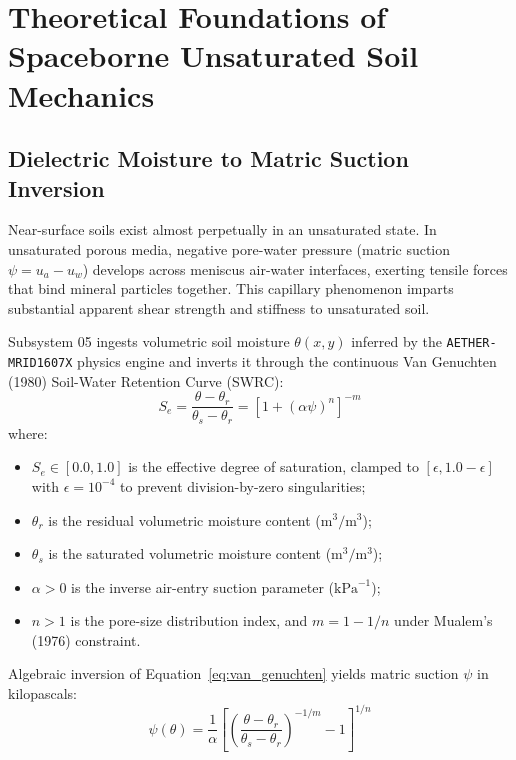 \documentclass[11pt,a4paper]{article}
\theoremstyle{definition}
\theoremstyle{remark}
\begin{document}
\section{Theoretical Foundations of Spaceborne Unsaturated Soil Mechanics}

\subsection{Dielectric Moisture to Matric Suction Inversion}
Near-surface soils exist almost perpetually in an unsaturated state. In unsaturated porous media, negative pore-water pressure (matric suction $\psi = u_a - u_w$) develops across meniscus air-water interfaces, exerting tensile forces that bind mineral particles together. This capillary phenomenon imparts substantial apparent shear strength and stiffness to unsaturated soil.

Subsystem 05 ingests volumetric soil moisture $\theta(x, y)$ inferred by the \texttt{AETHER-MRID1607X} physics engine and inverts it through the continuous Van Genuchten (1980) Soil-Water Retention Curve (SWRC):
\begin{equation}
    S_e = \frac{\theta - \theta_r}{\theta_s - \theta_r} = \left[ 1 + (\alpha \psi)^n \right]^{-m}
    \label{eq:van_genuchten}
\end{equation}
\noindent where:
\begin{itemize}
    \item $S_e \in [0.0, 1.0]$ is the effective degree of saturation, clamped to $[\epsilon, 1.0 - \epsilon]$ with $\epsilon = 10^{-4}$ to prevent division-by-zero singularities;
    \item $\theta_r$ is the residual volumetric moisture content ($\text{m}^3/\text{m}^3$);
    \item $\theta_s$ is the saturated volumetric moisture content ($\text{m}^3/\text{m}^3$);
    \item $\alpha > 0$ is the inverse air-entry suction parameter ($\text{kPa}^{-1}$);
    \item $n > 1$ is the pore-size distribution index, and $m = 1 - 1/n$ under Mualem's (1976) constraint.
\end{itemize}

Algebraic inversion of Equation~\eqref{eq:van_genuchten} yields matric suction $\psi$ in kilopascals:
\begin{equation}
    \psi(\theta) = \frac{1}{\alpha} \left[ \left( \frac{\theta - \theta_r}{\theta_s - \theta_r} \right)^{-1/m} - 1 \right]^{1/n}
    \label{eq:suction_solution}
\end{equation}
\end{document}
